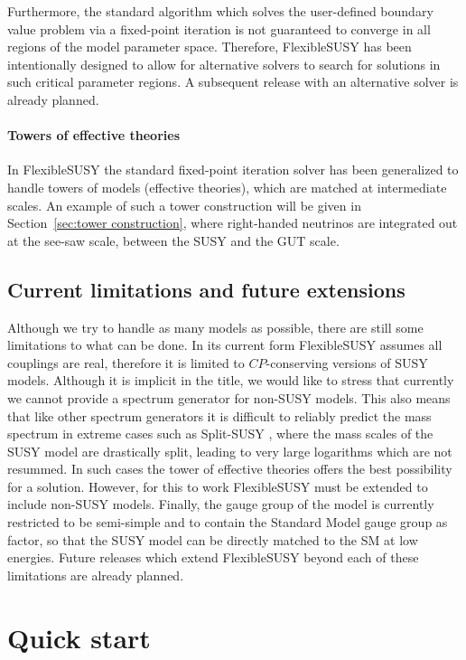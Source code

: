 \documentclass[final,3p,11pt,pdflatex]{elsarticle}
\makeatletter
\newcommand{\fs}{FlexibleSUSY\@\xspace}
\newcommand{\secref}[1]{Section~\ref{#1}}
\makeatother
\begin{document}
Furthermore, the standard algorithm which solves the user-defined
boundary value problem via a fixed-point iteration is not guaranteed
to converge in all regions of the model parameter space.  Therefore,
\fs has been intentionally designed to allow for alternative solvers
to search for solutions in such critical parameter regions.  A
subsequent release with an alternative solver is already planned.

\paragraph{Towers of effective theories}

In \fs the standard fixed-point iteration solver has been generalized
to handle towers of models (effective theories), which are matched at
intermediate scales.  An example of such a tower construction will be
given in \secref{sec:tower construction}, where right-handed neutrinos
are integrated out at the see-saw scale, between the SUSY and the GUT
scale.

\subsection{Current limitations and future extensions}
Although we try to handle as many models as possible, there are still
some limitations to what can be done. In its current form \fs assumes
all couplings are real, therefore it is limited to $CP$-conserving
versions of SUSY models.  Although it is implicit in the title, we
would like to stress that currently we cannot provide a spectrum
generator for non-SUSY models.  This also means that like other
spectrum generators it is difficult to reliably predict the mass
spectrum in extreme cases such as Split-SUSY
\cite{Wells:2003tf,ArkaniHamed:2004fb,Giudice:2004tc}, where the mass
scales of the SUSY model are drastically split, leading to very large
logarithms which are not resummed.  In such cases the tower of
effective theories offers the best possibility for a solution.
However, for this to work \fs must be extended to include non-SUSY
models.  Finally, the gauge group of the model is currently restricted
to be semi-simple and to contain the Standard Model gauge group as
factor, so that the SUSY model can be directly matched to the SM at
low energies.
%
Future releases which extend \fs beyond each of these limitations are
already planned.  

\section{Quick start}
\label{sec:download}
\end{document}

